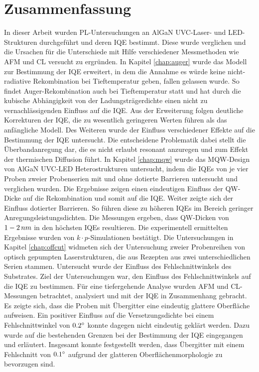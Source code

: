 
\chapter*{Zusammenfassung}
\thispagestyle{fancy}


In dieser Arbeit wurden PL-Untersuchungen an AlGaN UVC-Laser- und LED-Strukturen durchgeführt und deren IQE bestimmt. Diese wurde verglichen und die Ursachen für die Unterschiede mit Hilfe verschiedener Messmethoden wie AFM und CL versucht zu ergründen. In Kapitel \ref{chap:auger} wurde das Modell zur Bestimmung der IQE erweitert, in dem die Annahme es würde keine nicht-radiative Rekombination bei Tieftemperatur geben, fallen gelassen wurde. So findet Auger-Rekombination auch bei Tieftemperatur statt und hat durch die kubische Abhängigkeit von der Ladungsträgerdichte einen nicht zu vernachlässigenden Einfluss auf die IQE. Aus der Erweiterung folgen deutliche Korrekturen der IQE, die zu wesentlich geringeren Werten führen als das anfängliche Modell. Des Weiteren wurde der Einfluss verschiedener Effekte auf die Bestimmung der IQE untersucht. Die entscheidene Problematik dabei stellt die Überbandanregung dar, die es nicht erlaubt resonant anzuregen und zum Effekt der thermischen Diffusion führt. 
\newline
In Kapitel \ref{chap:mqw} wurde das MQW-Design von AlGaN UVC-LED Heterostrukturen untersucht, indem die IQEs von je vier Proben zweier Probenserien mit und ohne
dotierte Barrieren untersucht und verglichen wurden.  
Die Ergebnisse zeigen einen eindeutigen Einfluss der QW-Dicke auf die Rekombination und somit auf die IQE. Weiter zeigte sich der Einfluss dotierter Barrieren. So führen diese zu höheren IQEs im Bereich geringer Anregungsleistungsdichten. Die Messungen ergeben, dass QW-Dicken von $1-2 \thinspace nm$ in den höchsten IQEs resultieren. Die experimentell ermittelten Ergebnisse wurden von $k \cdot p$-Simulationen bestätigt. 
\newline
Die Untersuchungen in Kapitel \ref{chap:offcut} widmeten sich der Untersuchung zweier Probenreihen von optisch gepumpten Laserstrukturen, die aus Rezepten aus zwei unterschiedlichen Serien stammen. Untersucht wurde der Einfluss des Fehlschnittwinkels des Substrates. Ziel der Untersuchungen war, den Einfluss des Fehlschnittwinkels auf die IQE zu bestimmen. Für eine tiefergehende Analyse wurden AFM und CL-Messungen betrachtet, analysiert und mit der IQE in Zusammenhang gebracht. 
\newline
Es zeigte sich, dass die Proben mit Übergitter eine eindeutig glattere Oberfläche aufweisen. Ein positiver Einfluss auf die Versetzungsdichte bei einem Fehlschnittwinkel von $0.2 \degree$ konnte dagegen nicht eindeutig geklärt werden. Dazu wurde auf die bestehenden Grenzen bei der Bestimmung der IQE eingegangen und erläutert. Insgesamt konnte festgestellt werden, dass Übergitter mit einem Fehlschnitt von $0.1\degree$ aufgrund der glatteren Oberflächenmorphologie zu bevorzugen sind.
